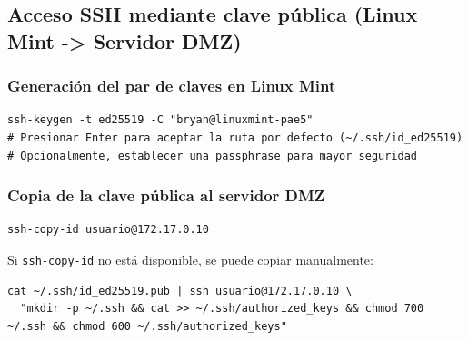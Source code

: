 \documentclass{article}
\renewcommand{\_}{\oldunderscore\hskip0pt\relax}
\begin{document}
\hypertarget{acceso-ssh-mediante-clave-puxfablica-linux-mint---servidor-dmz}{%
\subsection{Acceso SSH mediante clave pública (Linux Mint
-\textgreater{} Servidor
DMZ)}\label{acceso-ssh-mediante-clave-puxfablica-linux-mint---servidor-dmz}}

\hypertarget{generaciuxf3n-del-par-de-claves-en-linux-mint}{%
\subsubsection{Generación del par de claves en Linux
Mint}\label{generaciuxf3n-del-par-de-claves-en-linux-mint}}

\begin{Verbatim}[fontsize=\footnotesize,frame=single,rulecolor=\color{codebg},fillcolor=\color{codebg},framesep=2mm,xleftmargin=1mm,xrightmargin=1mm,breaklines=true,breakanywhere=true,breaksymbolleft={},breaksymbolright={}]
ssh-keygen -t ed25519 -C "bryan@linuxmint-pae5"
# Presionar Enter para aceptar la ruta por defecto (~/.ssh/id_ed25519)
# Opcionalmente, establecer una passphrase para mayor seguridad
\end{Verbatim}

\hypertarget{copia-de-la-clave-puxfablica-al-servidor-dmz}{%
\subsubsection{Copia de la clave pública al servidor
DMZ}\label{copia-de-la-clave-puxfablica-al-servidor-dmz}}

\begin{Verbatim}[fontsize=\footnotesize,frame=single,rulecolor=\color{codebg},fillcolor=\color{codebg},framesep=2mm,xleftmargin=1mm,xrightmargin=1mm,breaklines=true,breakanywhere=true,breaksymbolleft={},breaksymbolright={}]
ssh-copy-id usuario@172.17.0.10
\end{Verbatim}

Si \texttt{ssh-copy-id} no está disponible, se puede copiar manualmente:

\begin{Verbatim}[fontsize=\footnotesize,frame=single,rulecolor=\color{codebg},fillcolor=\color{codebg},framesep=2mm,xleftmargin=1mm,xrightmargin=1mm,breaklines=true,breakanywhere=true,breaksymbolleft={},breaksymbolright={}]
cat ~/.ssh/id_ed25519.pub | ssh usuario@172.17.0.10 \
  "mkdir -p ~/.ssh && cat >> ~/.ssh/authorized_keys && chmod 700 ~/.ssh && chmod 600 ~/.ssh/authorized_keys"
\end{Verbatim}
\end{document}
